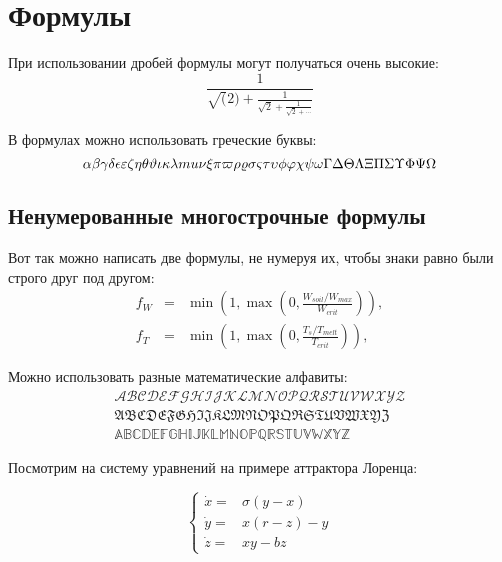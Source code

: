 
\section{Формулы} \label{sect1_4}


При использовании дробей формулы могут получаться очень высокие:
$$
  \frac{1}{\sqrt(2)+
  \displaystyle\frac{1}{\sqrt{2}+
  \displaystyle\frac{1}{\sqrt{2}+\cdots}}}
$$

В формулах можно использовать греческие буквы:
$$
\alpha\beta\gamma\delta\epsilon\varepsilon\zeta\eta\theta\vartheta\iota\kappa\lambda\\mu\nu\xi\pi\varpi\rho\varrho\sigma\varsigma\tau\upsilon\phi\varphi\chi\psi\omega\Gamma\Delta\Theta\Lambda\Xi\Pi\Sigma\Upsilon\Phi\Psi\Omega
$$


\subsection{Ненумерованные многострочные формулы} \label{subsect1_4_2}

Вот так можно написать две формулы, не нумеруя их, чтобы знаки равно были строго друг под другом:
\begin{eqnarray}
  f_W & = & \min \left( 1, \max \left( 0, \frac{W_{soil} / W_{max}}{W_{crit}} \right)  \right), \nonumber \\
  f_T & = & \min \left( 1, \max \left( 0, \frac{T_s / T_{melt}}{T_{crit}} \right)  \right), \nonumber
\end{eqnarray}

Можно использовать разные математические алфавиты:
\begin{eqnarray}
\mathcal{ABCDEFGHIJKLMNOPQRSTUVWXYZ} \nonumber \\
\mathfrak{ABCDEFGHIJKLMNOPQRSTUVWXYZ} \nonumber \\
\mathbb{ABCDEFGHIJKLMNOPQRSTUVWXYZ} \nonumber
\end{eqnarray}

Посмотрим на систему уравнений на примере аттрактора Лоренца:

$$
\left\{
  \begin{array}{rl}
    \dot x = & \sigma (y-x) \\
    \dot y = & x (r - z) - y \\
    \dot z = & xy - bz
  \end{array}
\right.
$$


